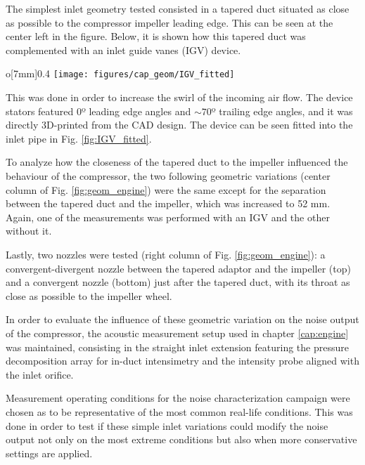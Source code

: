 The simplest inlet geometry tested consisted in a tapered duct situated as close as possible to the compressor impeller leading edge. This can be seen at the center left in the figure. Below, it is shown how this tapered duct was complemented with an inlet guide vanes (IGV) device.

\begin{wrapfigure}[15]{o}[7mm]{0.4\textwidth}
\centering
\texttt{[image: figures/cap\_geom/IGV\_fitted]}
\caption[Image of the 3D-printed IGV device]{Image of the 3D-printed IGV device fitted to the compressor inlet duct, looking towards the impeller.}
\label{fig:IGV_fitted}
\end{wrapfigure}

This was done in order to increase the swirl of the incoming air flow. The device stators featured 0º leading edge angles and $\sim 70$º trailing edge angles, and it was directly 3D-printed from the CAD design. The device can be seen fitted into the inlet pipe in Fig. \ref{fig:IGV_fitted}.

To analyze how the closeness of the tapered duct to the impeller influenced the behaviour of the compressor, the two following geometric variations (center column of Fig. \ref{fig:geom_engine}) were the same except for the separation between the tapered duct and the impeller, which was increased to 52 mm. Again, one of the measurements was performed with an IGV and the other without it.

Lastly, two nozzles were tested (right column of Fig. \ref{fig:geom_engine}): a convergent-divergent nozzle between the tapered adaptor and the impeller (top) and a convergent nozzle (bottom) just after the tapered duct, with its throat as close as possible to the impeller wheel.

In order to evaluate the influence of these geometric variation on the noise output of the compressor, the acoustic measurement setup used in chapter \ref{cap:engine} was maintained, consisting in the straight inlet extension featuring the pressure decomposition array for in-duct intensimetry and the intensity probe aligned with the inlet orifice.

Measurement operating conditions for the noise characterization campaign were chosen as to be representative of the most common real-life conditions. This was done in order to test if these simple inlet variations could modify the noise output not only on the most extreme conditions but also when more conservative settings are applied.

